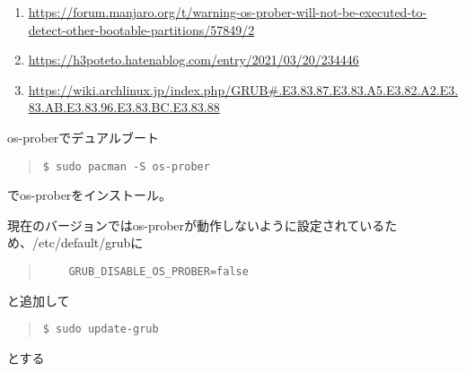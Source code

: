 \documentclass[dvipdfmx]{jsarticle}
\begin{document}
\begin{enumerate}
    \item \url{https://forum.manjaro.org/t/warning-os-prober-will-not-be-executed-to-detect-other-bootable-partitions/57849/2}
    \item \url{https://h3poteto.hatenablog.com/entry/2021/03/20/234446}
    \item \url{https://wiki.archlinux.jp/index.php/GRUB#.E3.83.87.E3.83.A5.E3.82.A2.E3.83.AB.E3.83.96.E3.83.BC.E3.83.88}
\end{enumerate}


os-proberでデュアルブート
\begin{quote}
    \begin{verbatim}
$ sudo pacman -S os-prober
    \end{verbatim}
\end{quote}

でos-proberをインストール。

現在のバージョンではos-proberが動作しないように設定されているため、/etc/default/grubに

\begin{quote}
    \begin{verbatim}
	GRUB_DISABLE_OS_PROBER=false
    \end{verbatim}
\end{quote}

と追加して

\begin{quote}
    \begin{verbatim}
$ sudo update-grub
    \end{verbatim}
\end{quote}

とする
\end{document}
